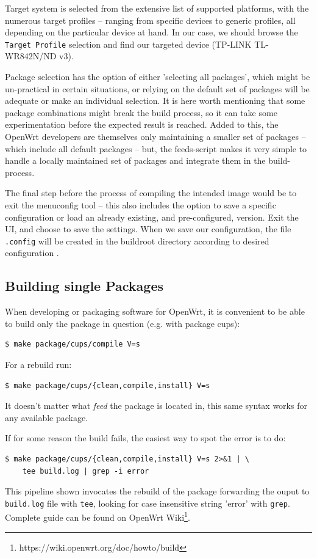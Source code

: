 Target system is selected from the extensive list of supported platforms, with the numerous target profiles – ranging from specific devices to generic profiles, all depending on the particular device at hand.
In our case, we should browse the {\tt Target Profile} selection and find our targeted device (TP-LINK TL-WR842N/ND v3).

Package selection has the option of either 'selecting all packages', which might be un-practical in certain situations, or relying on the default set of packages will be adequate or make an individual selection.
It is here worth mentioning that some package combinations might break the build process, so it can take some experimentation before the expected result is reached.
Added to this, the OpenWrt developers are themselves only maintaining a smaller set of packages – which include all default packages – but, the feeds-script makes it very simple to handle a locally maintained set of packages and integrate them in the build-process.

The final step before the process of compiling the intended image would be to exit the menuconfig tool – this also includes the option to save a specific configuration or load an already existing, and pre-configured, version.
Exit the UI, and choose to save the settings.
When we save our configuration, the file {\tt .config} will be created in the buildroot directory according to desired configuration \cite{build_owrt}.



\subsection{Building single Packages}

When developing or packaging software for OpenWrt, it is convenient to be able to build only the package in question (e.g. with package cups):
\begin{lstlisting}[columns=fixed,basicstyle=\ttfamily\footnotesize,tabsize=4,backgroundcolor=\color{yellow!10}]
$ make package/cups/compile V=s
\end{lstlisting}
For a rebuild run:
\begin{lstlisting}[columns=fixed,basicstyle=\ttfamily\footnotesize,tabsize=4,backgroundcolor=\color{yellow!10}]
$ make package/cups/{clean,compile,install} V=s
\end{lstlisting}
It doesn't matter what {\it feed} the package is located in, this same syntax works for any available package.

If for some reason the build fails, the easiest way to spot the error is to do:
\begin{lstlisting}[columns=fixed,basicstyle=\ttfamily\footnotesize,tabsize=4,backgroundcolor=\color{yellow!10}]
$ make package/cups/{clean,compile,install} V=s 2>&1 | \
    tee build.log | grep -i error
\end{lstlisting}
This pipeline shown invocates the rebuild of the package forwarding the ouput to {\tt build.log} file with {\tt tee}, looking for case insensitive string 'error' with {\tt grep}.
Complete guide can be found on OpenWrt Wiki\footnote{https://wiki.openwrt.org/doc/howto/build}.
